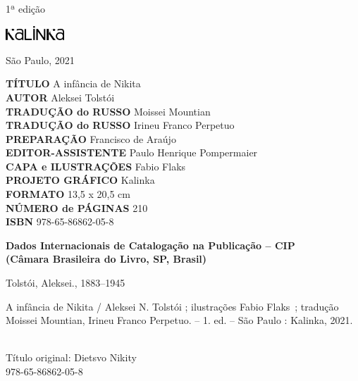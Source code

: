 {\vfill

\begin{center}
1ª edição

\smallskip

\includegraphics[width=2.2cm]{./LOGOTIPO_KALINKA.jpg}

São Paulo, 2021
\end{center}

\pagebreak
\flushleft
\pagestyle{empty}
\tiny




\vfill

\textbf{TÍTULO} A infância de Nikita\\
\textbf{AUTOR} Aleksei Tolstói\\
\textbf{TRADUÇÃO do RUSSO} Moissei Mountian\\
\textbf{TRADUÇÃO do RUSSO} Irineu Franco Perpetuo\\
\textbf{PREPARAÇÃO} Francisco de Araújo\\
\textbf{EDITOR-ASSISTENTE} Paulo Henrique Pompermaier\\
\textbf{CAPA e ILUSTRAÇÕES} Fabio Flaks\\
\textbf{PROJETO GRÁFICO} Kalinka\\
\textbf{FORMATO} 13,5 x 20,5 cm\\
\textbf{NÚMERO de PÁGINAS} 210\\
\textbf{ISBN} 978-65-86862-05-8\\

\bigskip
\bigskip


\begin{flushleft}
\textbf{Dados Internacionais de Catalogação na Publicação -- CIP}\\
\textbf{(Câmara Brasileira do Livro, SP, Brasil)}\\
\hrulefill
\end{flushleft}
\hspace{5pt}Tolstói, Aleksei., 1883--1945\\
\hspace{20pt}\parbox{185pt}{A infância de Nikita / Aleksei N. Tolstói ; ilustrações Fabio Flaks~; tradução Moissei Mountian, Irineu Franco Perpetuo. -- 1. ed. -- São Paulo : Kalinka, 2021.}\\[6pt]

\hspace{20pt}Título original: Dietsvo Nikity\\
\hspace{20pt} 978-65-86862-05-8\\[6pt]

}
